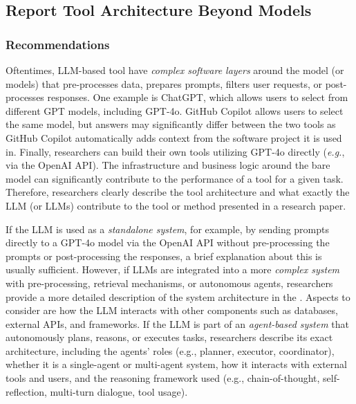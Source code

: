 



\subsection{Report Tool Architecture Beyond Models}


\subsubsection{Recommendations}

Oftentimes, LLM-based tool have \emph{complex software layers} around the model (or models) that pre-processes data, prepares prompts, filters user requests, or post-processes responses.
One example is ChatGPT, which allows users to select from different GPT models, including GPT-4o.
GitHub Copilot allows users to select the same model, but answers may significantly differ between the two tools as GitHub Copilot automatically adds context from the software project it is used in.
Finally, researchers can build their own tools utilizing GPT-4o directly (\textit{e.g.}, via the OpenAI API).
The infrastructure and business logic around the bare model can significantly contribute to the performance of a tool for a given task.
Therefore, researchers \must clearly describe the tool architecture and what exactly the LLM (or LLMs) contribute to the tool or method presented in a research paper.

If the LLM is used as a \emph{standalone system}, for example, by sending prompts directly to a GPT-4o model via the OpenAI API without pre-processing the prompts or post-processing the responses, a brief explanation about this is usually sufficient.
However, if LLMs are integrated into a more \emph{complex system} with pre-processing, retrieval mechanisms, or autonomous agents, researchers \must provide a more detailed description of the system architecture in the \paper.
Aspects to consider are how the LLM interacts with other components such as databases, external APIs, and frameworks.
If the LLM is part of an \emph{agent-based system} that autonomously plans, reasons, or executes tasks, researchers \must describe its exact architecture, including the agents' roles (e.g., planner, executor, coordinator), whether it is a single-agent or multi-agent system, how it interacts with external tools and users, and the reasoning framework used (e.g., chain-of-thought, self-reflection, multi-turn dialogue, tool usage).

